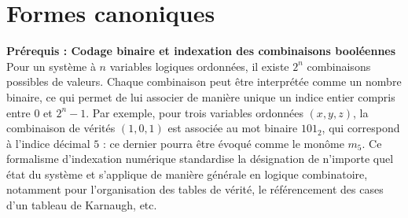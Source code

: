 \documentclass[a4paper,11pt]{article}
\begin{document}
\section{Formes canoniques}
\noindent\textbf{Prérequis : Codage binaire et indexation des combinaisons booléennes}\\
Pour un système à $n$ variables logiques ordonnées, il existe $2^n$ combinaisons possibles de valeurs. Chaque combinaison peut être interprétée comme un nombre binaire, ce qui permet de lui associer de manière unique un indice entier compris entre $0$ et $2^n - 1$. Par exemple, pour trois variables ordonnées $(x, y, z)$, la combinaison de vérités $(1, 0, 1)$ est associée au mot binaire $101_2$, qui correspond à l'indice décimal $5$ : ce dernier pourra être évoqué comme le monôme $m_5$. Ce formalisme d'indexation numérique standardise la désignation de n'importe quel état du système et s'applique de manière générale en logique combinatoire, notamment pour l'organisation des tables de vérité, le référencement des cases d'un tableau de Karnaugh, etc.
\end{document}
